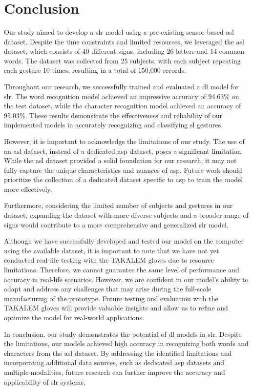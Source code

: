 \section{Conclusion}
\paragraph{}
Our study aimed to develop a \ac{slr} model using a pre-existing sensor-based \ac{asl} dataset. Despite the time constraints and limited resources, we leveraged the \ac{asl} dataset, which consists of 40 different signs, including 26 letters and 14 common words. The dataset was collected from 25 subjects, with each subject repeating each gesture 10 times, resulting in a total of 150,000 records.

Throughout our research, we successfully trained and evaluated a \ac{dl} model for \ac{slr}. The word recognition model achieved an impressive accuracy of 94.63\% on the test dataset, while the character recognition model achieved an accuracy of 95.03\%. These results demonstrate the effectiveness and reliability of our implemented models in accurately recognizing and classifying \ac{sl} gestures.

However, it is important to acknowledge the limitations of our study. The use of an \ac{asl} dataset, instead of a dedicated \ac{asp} dataset, poses a significant limitation. While the \ac{asl} dataset provided a solid foundation for our research, it may not fully capture the unique characteristics and nuances of \ac{asp}. Future work should prioritize the collection of a dedicated dataset specific to \ac{asp} to train the model more effectively.

Furthermore, considering the limited number of subjects and gestures in our dataset, expanding the dataset with more diverse subjects and a broader range of signs would contribute to a more comprehensive and generalized \ac{slr} model.

Although we have successfully developed and tested our model on the computer using the available dataset, it is important to note that we have not yet conducted real-life testing with the TAKALEM gloves due to resource limitations. Therefore, we cannot guarantee the same level of performance and accuracy in real-life scenarios. However, we are confident in our model's ability to adapt and address any challenges that may arise during the full-scale manufacturing of the prototype. Future testing and evaluation with the TAKALEM gloves will provide valuable insights and allow us to refine and optimize the model for real-world applications.

In conclusion, our study demonstrates the potential of \ac{dl} models in \ac{slr}. Despite the limitations, our models achieved high accuracy in recognizing both words and characters from the \ac{asl} dataset. By addressing the identified limitations and incorporating additional data sources, such as dedicated \ac{asp} datasets and multiple modalities, future research can further improve the accuracy and applicability of \ac{slr} systems.

